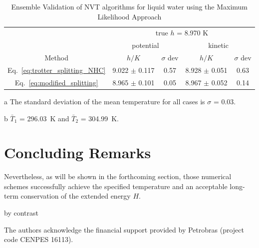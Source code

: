 \documentclass[
journal=jctcce,
layout=twocolumn
]{achemso}
\newcommand{\timestep}{h}
\begin{document}
\begin{table}
	\begin{threeparttable}
		\caption{Ensemble Validation of NVT algorithms for liquid water using the Maximum Likelihood Approach  }
		\label{table:ensemblevalidation}
			\begin{tabular}{ccccc}
				& \multicolumn{4}{c}{true $\timestep$ = 8.970 K} \\
				\cline{2-5}
				& \multicolumn{2}{c}{potential} & \multicolumn{2}{c}{kinetic}\\
				\hline
				Method  &$\timestep/K$ & $\sigma$ dev & $\timestep/K$ & $\sigma$ dev \\
				\hline %
				Eq.~\eqref{eq:trotter_splitting_NHC} & 9.022 $\pm$ 0.117 & 0.57 & 8.928 $\pm$ 0.051 & 0.63 \\
				Eq.~\eqref{eq:modified_splitting}    & 8.965 $\pm$ 0.101 & 0.05 & 8.967 $\pm$ 0.052 & 0.14
		\end{tabular}
		\begin{tablenotes}
			\item[a] The standard deviation of the mean temperature for all cases is $\sigma$ = 0.03.
			\item[b] $\bar{T}_1$ = 296.03~K and $\bar{T}_2$ = 304.99~K.
		\end{tablenotes}
	\end{threeparttable}
\end{table}



\section{Concluding Remarks}
\label{sec:conclusion}
Nevertheless, as will be shown in the forthcoming section, those numerical schemes successfully achieve the specified temperature and an acceptable long-term conservation of the extended energy $H$.

by contrast

\begin{acknowledgement}
	The authors acknowledge the financial support provided by Petrobras (project code CENPES 16113).
\end{acknowledgement}
\end{document}
